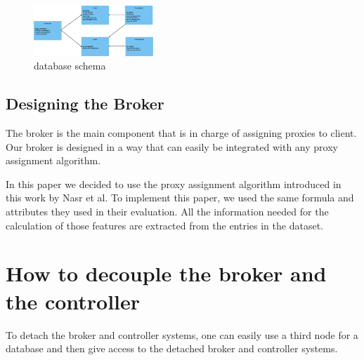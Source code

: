 \documentclass[conference]{IEEEtran}
\begin{document}
\begin{figure}[h]
    \centering
    \includegraphics[width=0.4\textwidth]{schema.jpeg}
    \caption{database schema}
    \label{fig:schema}
\end{figure}

\subsection{Designing the Broker}
The broker is the main component that is in charge of assigning proxies to client. Our broker is designed in a way that can easily be integrated with any proxy assignment algorithm.

In this paper we decided to use the proxy assignment algorithm introduced in this \cite{nasr2019enemy} work by Nasr et al. To implement this paper, we used the same formula and attributes they used in their evaluation. All the information needed for the calculation of those features are extracted from the entries in the dataset.

\section{How to decouple the broker and the controller}
To detach the broker and controller systems, one can easily use a third node for a database and then give access to the detached broker and controller systems.

\printbibliography
\end{document}
